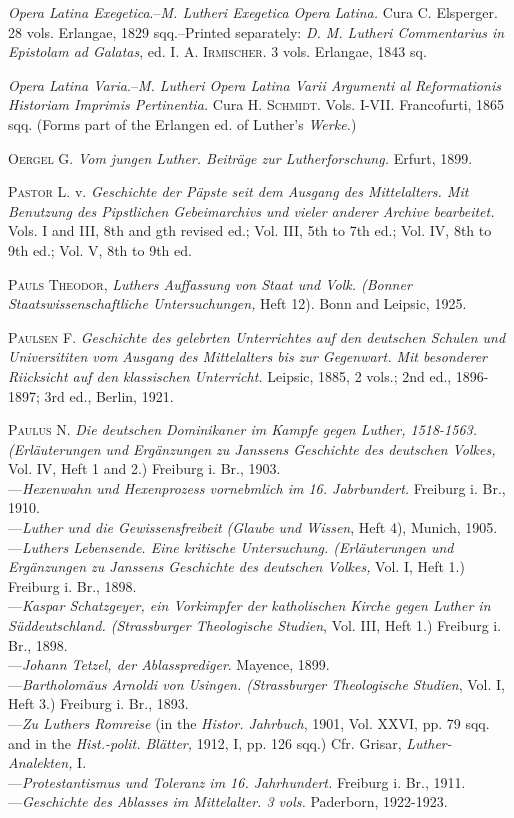 \textit{Opera Latina Exegetica}.--\textit{M. Lutheri Exegetica Opera Latina.} Cura C. Elsperger.
28 vols. Erlangae, 1829 sqq.--Printed separately: \textit{D. M. Lutheri
Commentarius in Epistolam ad Galatas}, ed. \textsc{I. A. Irmischer.} 3 vols. Erlangae,
1843 sq.

\textit{Opera Latina Varia}.--\textit{M. Lutheri Opera Latina Varii Argumenti al Reformationis
Historiam Imprimis Pertinentia.} Cura \textsc{H. Schmidt.} Vols. I-VII.
Francofurti, 1865 sqq. (Forms part of the Erlangen ed. of Luther’s
\textit{Werke.})

\textsc{Oergel G.} \textit{Vom jungen Luther. Beiträge zur Lutherforschung.} Erfurt, 1899.

\textsc{Pastor L.} v. \textit{Geschichte der Päpste seit dem Ausgang des Mittelalters. Mit
Benutzung des Pipstlichen Gebeimarchivs und vieler anderer Archive
bearbeitet.} Vols. I and III, 8th and gth revised ed.; Vol. III, 5th to 7th ed.;
Vol. IV, 8th to 9th ed.; Vol. V, 8th to 9th ed.

\textsc{Pauls Theodor}, \textit{Luthers Auffassung von Staat und Volk. (Bonner Staatswissenschaftliche
Untersuchungen,} Heft 12). Bonn and Leipsic, 1925.

\textsc{Paulsen F.} \textit{Geschichte des gelebrten Unterrichtes auf den deutschen Schulen
und Universititen vom Ausgang des Mittelalters bis zur Gegenwart. Mit
besonderer Riicksicht auf den klassischen Unterricht.} Leipsic, 1885, 2
vols.; 2nd ed., 1896-1897; 3rd ed., Berlin, 1921.

\textsc{Paulus N.} \textit{Die deutschen Dominikaner im Kampfe gegen Luther, 1518-1563.
(Erläuterungen und Ergänzungen zu Janssens Geschichte des deutschen
Volkes,} Vol. IV, Heft 1 and 2.) Freiburg i. Br., 1903. \\
---\textit{Hexenwahn und Hexenprozess vornebmlich im 16. Jabrbundert.}
Freiburg i. Br., 1910. \\
---\textit{Luther und die Gewissensfreibeit (Glaube und Wissen}, Heft 4),
Munich, 1905. \\
---\textit{Luthers Lebensende. Eine kritische Untersuchung. (Erläuterungen und
Ergänzungen zu Janssens Geschichte des deutschen Volkes,} Vol. I, Heft
1.) Freiburg i. Br., 1898. \\
---\textit{Kaspar Schatzgeyer, ein Vorkimpfer der katholischen Kirche gegen
Luther in Süddeutschland. (Strassburger Theologische Studien}, Vol. III,
Heft 1.) Freiburg i. Br., 1898. \\
---\textit{Johann Tetzel, der Ablassprediger}. Mayence, 1899. \\
---\textit{Bartholomäus Arnoldi von Usingen. (Strassburger Theologische Studien},
Vol. I, Heft 3.) Freiburg i. Br., 1893. \\
---\textit{Zu Luthers Romreise} (in the \textit{Histor. Jahrbuch}, 1901, Vol. XXVI, pp.
79 sqq. and in the \textit{Hist.-polit. Blätter,} 1912, I, pp. 126 sqq.) Cfr. Grisar,
\textit{Luther-Analekten,} I. \\
---\textit{Protestantismus und Toleranz im 16. Jahrhundert.} Freiburg i. Br., 1911. \\
---\textit{Geschichte des Ablasses im Mittelalter. 3 vols.} Paderborn, 1922-1923. \\


